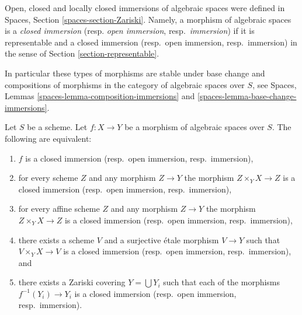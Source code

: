 \noindent
Open, closed and locally closed immersions of algebraic spaces were defined in
Spaces, Section \ref{spaces-section-Zariski}.
Namely, a morphism of algebraic spaces is a
{\it closed immersion} (resp. {\it open immersion}, resp.\ {\it immersion})
if it is representable and a closed immersion (resp.\ open immersion,
resp.\ immersion) in the sense of Section \ref{section-representable}.

\medskip\noindent
In particular these types of morphisms are stable under base change
and compositions of morphisms in the category of algebraic
spaces over $S$, see
Spaces, Lemmas \ref{spaces-lemma-composition-immersions} and
\ref{spaces-lemma-base-change-immersions}.

\begin{lemma}
\label{lemma-closed-immersion-local}
Let $S$ be a scheme. Let $f : X \to Y$ be a morphism of algebraic spaces
over $S$. The following are equivalent:
\begin{enumerate}
\item $f$ is a closed immersion (resp.\ open immersion, resp.\ immersion),
\item for every scheme $Z$ and any morphism $Z \to Y$ the morphism
$Z \times_Y X \to Z$ is a closed immersion (resp.\ open immersion,
resp.\ immersion),
\item for every affine scheme $Z$ and any morphism
$Z \to Y$ the morphism $Z \times_Y X \to Z$ is a closed immersion
(resp.\ open immersion, resp.\ immersion),
\item there exists a scheme $V$ and a surjective \'etale morphism
$V \to Y$ such that $V \times_Y X \to V$ is a closed immersion
(resp.\ open immersion, resp.\ immersion), and
\item there exists a Zariski covering $Y = \bigcup Y_i$ such that
each of the morphisms $f^{-1}(Y_i) \to Y_i$ is a closed immersion
(resp.\ open immersion, resp.\ immersion).
\end{enumerate}
\end{lemma}

